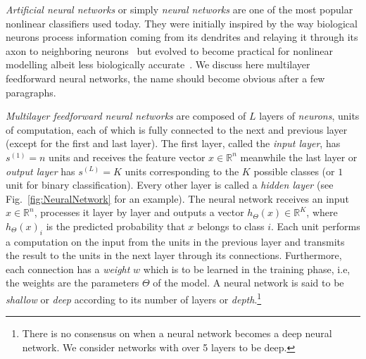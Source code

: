 \emph{Artificial neural networks} or simply \emph{neural networks} are one of the most popular nonlinear classifiers used today. They were initially inspired by the way biological neurons process information coming from its dendrites and relaying it through its axon to neighboring neurons~\cite{McCulloch1943, Widrow1960, Rosenblatt1962} but evolved to become practical for nonlinear modelling albeit less biologically accurate~\cite{Rumelhart1986}. We discuss here multilayer feedforward neural networks, the name should become obvious after a few paragraphs.

\emph{Multilayer feedforward neural networks} are composed of $L$ layers of \emph{neurons}, units of computation, each of which is fully connected to the next and previous layer (except for the first and last layer). The first layer, called the \emph{input layer}, has $s^{(1)} = n$ units and receives the feature vector $x \in \mathbb{R}^n$ meanwhile the last layer or \emph{output layer} has $s^{(L)} = K$ units corresponding to the $K$ possible classes (or $1$ unit for binary classification). Every other layer is called a \emph{hidden layer} (see Fig.~\ref{fig:NeuralNetwork} for an example). The neural network receives an input $x \in \mathbb{R}^n$, processes it layer by layer and outputs a vector $h_\Theta(x) \in \mathbb{R}^K$, where $h_\Theta(x)_i$ is the predicted probability that $x$ belongs to class $i$. Each unit performs a computation on the input from the units in the previous layer and transmits the result to the units in the next layer through its connections. Furthermore, each connection has a \emph{weight} $w$ which is to be learned in the training phase, i.e, the weights are the parameters $\Theta$ of the model. A neural network is said to be \emph{shallow} or \emph{deep} according to its number of layers or \emph{depth}.\footnote{There is no consensus on when a neural network becomes a deep neural network\cite{Schmidhuber2015}. We consider networks with over 5 layers to be deep.}

